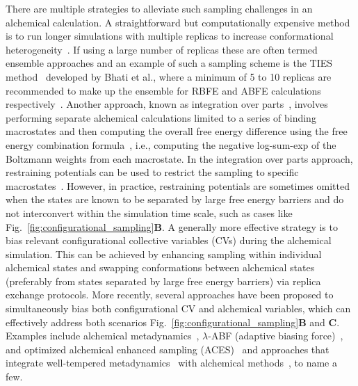 \documentclass[9pt,bestpractices]{livecoms}
\begin{document}
There are multiple strategies to alleviate such sampling challenges in an alchemical calculation. A straightforward but computationally expensive method is to run longer simulations with multiple replicas to increase conformational heterogeneity~\cite{suruzhon2021sensitivity}.
If using a large number of replicas these are often termed ensemble approaches and an example of such a sampling scheme is the TIES method~\cite{bhati2017} developed by Bhati et al., where a minimum of 5 to 10 replicas are recommended to make up the ensemble for RBFE and ABFE calculations respectively~\cite{bhati2022, bhati2025}.
Another approach, known as integration over parts~\cite{jayachandran2006parallelized}, involves performing separate alchemical calculations limited to a series of binding macrostates and  then computing the overall free energy difference using the free energy combination formula~\cite{gallicchio2011recent,hsu2023alchemical}, i.e., computing the negative log-sum-exp of the Boltzmann weights from each macrostate. In the integration over parts approach, restraining potentials can be used to restrict the sampling to specific macrostates~\cite{khuttan2023taming}. However, in practice, restraining potentials are sometimes omitted when the states are known to be separated by large free energy barriers and do not interconvert within the simulation time scale, such as cases like Fig.~\ref{fig:configurational_sampling}\textbf{B}.
A generally more effective strategy is to bias relevant configurational collective variables (CVs) during the alchemical simulation. This can be achieved by enhancing sampling within individual alchemical states and swapping conformations between alchemical states (preferably from states separated by large free energy barriers) via replica exchange protocols. More recently, several approaches have been proposed to simultaneously bias both configurational CV and alchemical variables, which can effectively address both scenarios Fig.~\ref{fig:configurational_sampling}\textbf{B} and \textbf{C}. Examples include alchemical metadynamics~\cite{hsu2023alchemical}, $\lambda$-ABF (adaptive biasing force)~\cite{lagardere2024lambda}, and optimized alchemical enhanced sampling (ACES)~\cite{lee2023aces}  and approaches that integrate well-tempered metadynamics~\cite{barducci2008well} with alchemical methods~\cite{zhou2025zooming, khuttan2024make}, to name a few.
\end{document}
